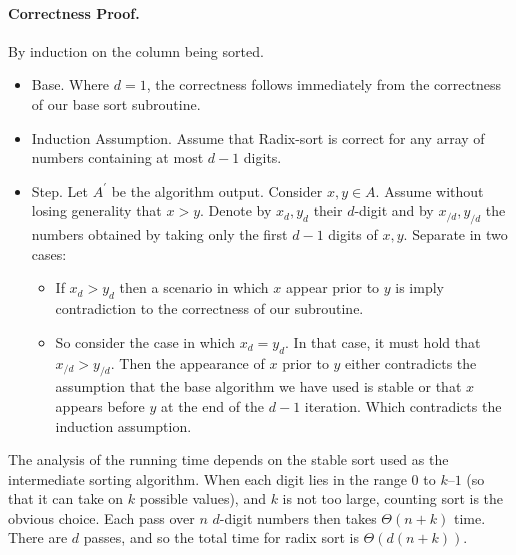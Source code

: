 \paragraph{Correctness Proof.} By induction on the column being sorted.
\begin{itemize}
  \item Base. Where $d = 1$, the correctness follows immediately from the correctness of our base sort subroutine. 
  \item Induction Assumption. Assume that Radix-sort is correct for any array of numbers containing at most $d-1$ digits. 
  \item Step. Let $A^{\prime}$  be the algorithm output. Consider $x,y \in A$. Assume without losing generality that $x > y$. Denote by $x_{d}, y_{d}$ their $d$-digit and by $x_{/d}, y_{/d}$ the numbers obtained by taking only the first  $d-1$ digits of $x,y$. Separate in two cases:

    \begin{itemize}
      \item   If $x_{d} > y_{d}$ then a scenario in which $x$ appear prior to $y$ is  imply contradiction to the correctness of our subroutine.
      \item   So consider the case in which $x_{d} = y_{d}$. In that case, it must hold that $x_{/d} > y_{/d}$. Then the appearance of $x$ prior to $y$ either contradicts the assumption that the base algorithm we have used is stable or that $x$ appears before $y$ at the end of the $d-1$ iteration. Which contradicts the induction assumption. 
    \end{itemize}
 \end{itemize}

The analysis of the running time depends on the stable sort used as the intermediate sorting algorithm. When each digit lies in the range $0$ to $k – 1$ (so that it can take on $k$ possible values), and $k$ is not too large, counting sort is the obvious choice. Each pass over $n$ $d$-digit numbers then takes $\Theta(n + k)$ time. There are $d$ passes, and so the total time for radix sort is $\Theta\left(d(n + k)\right)$.



